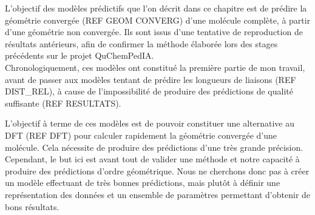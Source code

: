 \par L'objectif des modèles prédictifs que l'on décrit dans ce chapitre est de prédire la géométrie convergée (REF GEOM CONVERG) d'une molécule complète, à partir d'une géométrie non convergée. Ils sont issus d'une tentative de reproduction de résultats antérieurs, afin de confirmer la méthode élaborée lors des stages précédents sur le projet QuChemPedIA.\\
Chronologiquement, ces modèles ont constitué la première partie de mon travail, avant de passer aux modèles tentant de prédire les longueurs de liaisons (REF DIST\_REL), à cause de l'impossibilité de produire des prédictions de qualité suffisante (REF RESULTATS).\\

\par L'objectif à terme de ces modèles est de pouvoir constituer une alternative au DFT (REF DFT) pour calculer rapidement la géométrie convergée d'une molécule. Cela nécessite de produire des prédictions d'une très grande précision. Cependant, le but ici est avant tout de valider une méthode et notre capacité à produire des prédictions d'ordre géométrique. Nous ne cherchons donc pas à créer un modèle effectuant de très bonnes prédictions, mais plutôt à définir une représentation des données et un ensemble de paramètres permettant d'obtenir de bons résultats.